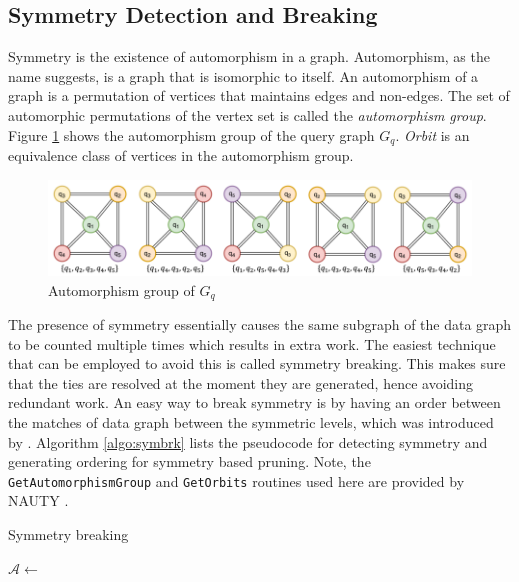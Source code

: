 \subsection{Symmetry Detection and Breaking}\label{sec:sym-detection}
Symmetry is the existence of automorphism in a graph. Automorphism, as the name suggests, is a graph that is isomorphic to itself.
An automorphism of a graph is a permutation of vertices that maintains edges and non-edges.
The set of automorphic permutations of the vertex set is called the \textit{automorphism group}.
Figure \ref{fig:automorphism} shows the automorphism group of the query graph $G_q$.
\textit{Orbit} is an equivalence class of vertices in the automorphism group.
\begin{figure}
    \includegraphics[width=\textwidth]{fig/LR/automorphism.png}
    \caption{Automorphism group of $G_q$}
    \label{fig:automorphism}
\end{figure}

The presence of symmetry essentially causes the same subgraph of the data graph to be counted multiple times which results in extra work.
The easiest technique that can be employed to avoid this is called symmetry breaking. This makes sure that the ties are resolved at the moment they are generated, hence avoiding redundant work.
An easy way to break symmetry is by having an order between the matches of data graph between the symmetric levels, which was introduced by \cite{symbreak}. Algorithm \ref{algo:symbrk} lists the pseudocode for detecting symmetry and generating ordering for symmetry based pruning. Note, the \texttt{GetAutomorphismGroup} and \texttt{GetOrbits} routines used here are provided by NAUTY \cite{nauty}.

\begin{algorithm}
    \caption{Symmetry breaking}
    \label{algo:symbrk}
    $\mathcal{A} \leftarrow$ \;
\end{algorithm}


